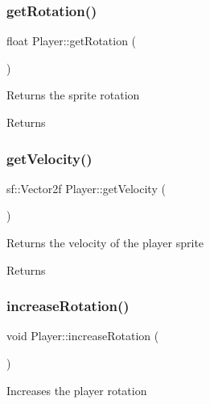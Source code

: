 \subsubsection{\texorpdfstring{getRotation()}{getRotation()}}
{\footnotesize\ttfamily float Player\+::get\+Rotation (\begin{DoxyParamCaption}{ }\end{DoxyParamCaption})}



Returns the sprite rotation 

\begin{DoxyReturn}{Returns}

\end{DoxyReturn}
\mbox{\label{class_player_a363489e11401d5a1549e315c8c8aa220}} 
\subsubsection{\texorpdfstring{getVelocity()}{getVelocity()}}
{\footnotesize\ttfamily sf\+::\+Vector2f Player\+::get\+Velocity (\begin{DoxyParamCaption}{ }\end{DoxyParamCaption})}



Returns the velocity of the player sprite 

\begin{DoxyReturn}{Returns}

\end{DoxyReturn}
\mbox{\label{class_player_a0f6f4bb800443551229331a68c3c3234}} 
\subsubsection{\texorpdfstring{increaseRotation()}{increaseRotation()}}
{\footnotesize\ttfamily void Player\+::increase\+Rotation (\begin{DoxyParamCaption}{ }\end{DoxyParamCaption})}



Increases the player rotation 

\mbox{\label{class_player_a53938857e80374e79726309e78d1c15c}} 
